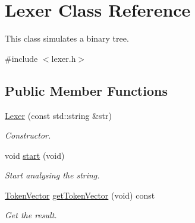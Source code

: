 \hypertarget{class_lexer}{}\section{Lexer Class Reference}
\label{class_lexer}


This class simulates a binary tree.  




{\ttfamily \#include $<$lexer.\+h$>$}

\subsection*{Public Member Functions}
\begin{DoxyCompactItemize}
\item 
\hyperlink{class_lexer_a643965a215d7b8f84be82239465fea5f}{Lexer} (const std\+::string \&str)
\begin{DoxyCompactList}\small\item\em Constructor. \end{DoxyCompactList}\item 
\hypertarget{class_lexer_a38b525bdff5c3f3aca8c19838b480086}{}void \hyperlink{class_lexer_a38b525bdff5c3f3aca8c19838b480086}{start} (void)\label{class_lexer_a38b525bdff5c3f3aca8c19838b480086}

\begin{DoxyCompactList}\small\item\em Start analysing the string. \end{DoxyCompactList}\item 
\hyperlink{token_8h_a8318de25ae453e04997e41e88c9fad7d}{Token\+Vector} \hyperlink{class_lexer_ad590d7968a57fdbe5bc1df94364851e8}{get\+Token\+Vector} (void) const 
\begin{DoxyCompactList}\small\item\em Get the result. \end{DoxyCompactList}\end{DoxyCompactItemize}

